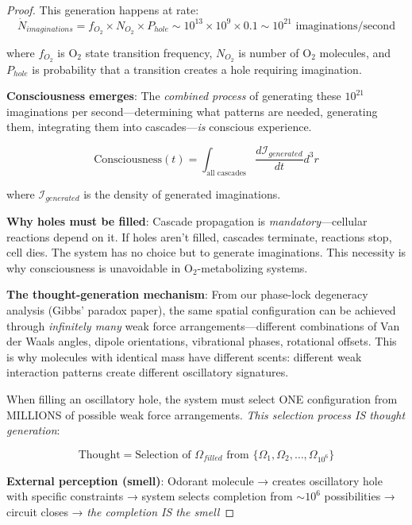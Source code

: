 \documentclass[11pt,a4paper]{article}
\begin{document}
\begin{proof}
This generation happens at rate:
\begin{equation}
\dot{N}_{imaginations} = f_{O_2} \times N_{O_2} \times P_{hole} \sim 10^{13} \times 10^9 \times 0.1 \sim 10^{21} \text{ imaginations/second}
\end{equation}

where $f_{O_2}$ is O$_2$ state transition frequency, $N_{O_2}$ is number of O$_2$ molecules, and $P_{hole}$ is probability that a transition creates a hole requiring imagination.

\textbf{Consciousness emerges}: The \textit{combined process} of generating these $10^{21}$ imaginations per second—determining what patterns are needed, generating them, integrating them into cascades—\textit{is} conscious experience.

\begin{equation}
\text{Consciousness}(t) = \int_{\text{all cascades}} \frac{d\mathcal{I}_{generated}}{dt} d^3r
\end{equation}

where $\mathcal{I}_{generated}$ is the density of generated imaginations.

\textbf{Why holes must be filled}: Cascade propagation is \textit{mandatory}—cellular reactions depend on it. If holes aren't filled, cascades terminate, reactions stop, cell dies. The system has no choice but to generate imaginations. This necessity is why consciousness is unavoidable in O$_2$-metabolizing systems.

\textbf{The thought-generation mechanism}: From our phase-lock degeneracy analysis (Gibbs' paradox paper), the same spatial configuration can be achieved through \textit{infinitely many} weak force arrangements—different combinations of Van der Waals angles, dipole orientations, vibrational phases, rotational offsets. This is why molecules with identical mass have different scents: different weak interaction patterns create different oscillatory signatures.

When filling an oscillatory hole, the system must select ONE configuration from MILLIONS of possible weak force arrangements. \textit{This selection process IS thought generation}:

\begin{equation}
\text{Thought} = \text{Selection of } \Omega_{filled} \text{ from } \{\Omega_1, \Omega_2, \ldots, \Omega_{10^6}\}
\end{equation}

\textbf{External perception (smell)}: Odorant molecule → creates oscillatory hole with specific constraints → system selects completion from $\sim 10^6$ possibilities → circuit closes → \textit{the completion IS the smell}


\end{proof}
\end{document}
